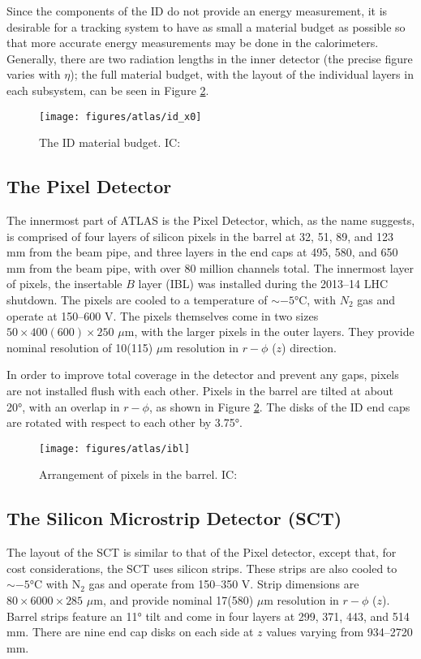 Since the components of the ID do not provide an energy measurement, it is desirable for a tracking system to have as small a material budget as possible so that more accurate energy measurements may be done in the calorimeters.  Generally, there are two radiation lengths in the inner detector (the precise figure varies with $\eta$); the full material budget, with the layout of the individual layers in each subsystem, can be seen in Figure \ref{fig:idmb}.  

\begin{figure}[!htbp]\captionsetup{justification=centering}
  \centering
  \texttt{[image: figures/atlas/id\_x0]}
  \caption{The ID material budget. IC: \cite{idmaterial}}
  \label{fig:idmb}
\end{figure}

\subsection{The Pixel Detector}
The innermost part of ATLAS is the Pixel Detector, which, as the name suggests, is comprised of four layers of silicon pixels in the barrel at 32, 51, 89, and 123 mm from the beam pipe, and three layers in the end caps at 495, 580, and 650 mm from the beam pipe, with over 80 million channels total.  The innermost layer of pixels, the insertable $B$ layer (IBL) was installed during the 2013--14 LHC shutdown.  The pixels are cooled to a temperature of $\sim-\ang{5}$C, with $N_2$ gas and operate at 150--600 V.  The pixels themselves come in two sizes $50\times400(600)\times250$ $\mu$m, with the larger pixels in the outer layers.  They provide nominal resolution of 10(115) $\mu$m resolution in $r-\phi$ ($z$) direction.

In order to improve total coverage in the detector and prevent any gaps, pixels are not installed flush with each other.  Pixels in the barrel are tilted at about \ang{20}, with an overlap in $r-\phi$, as shown in Figure \ref{fig:idmb}.  The disks of the ID end caps are rotated with respect to each other by \ang{3.75}.

\begin{figure}[!htbp]\captionsetup{justification=centering}
  \centering
  \texttt{[image: figures/atlas/ibl]}
  \caption{Arrangement of pixels in the barrel. IC: \cite{ibltdr}}
  \label{fig:idmb}
\end{figure}

\subsection{The Silicon Microstrip Detector (SCT)}
The layout of the SCT is similar to that of the Pixel detector, except that, for cost considerations, the SCT uses silicon strips.  These strips are also cooled to $\sim-\ang{5}$C with N$_2$ gas and operate from 150--350 V.  Strip dimensions are $80\times 6 000\times285$ $\mu$m, and provide nominal  17(580) $\mu$m resolution in $r-\phi$ ($z$).  Barrel strips feature an \ang{11} tilt and come in four layers at 299, 371, 443, and 514 mm.  There are nine  end cap disks on each side at $z$ values varying from 934--2720 mm.

